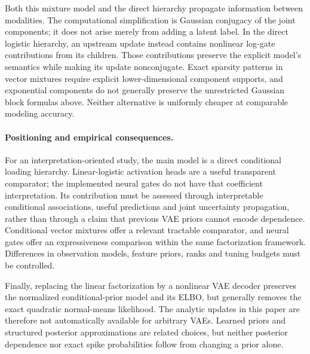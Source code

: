Both this mixture model and the direct hierarchy propagate information
between modalities. The computational simplification is Gaussian
conjugacy of the joint components; it does not arise merely from adding
a latent label. In the direct logistic hierarchy, an upstream update
instead contains nonlinear log-gate contributions from its children.
Those contributions preserve the explicit model's semantics while
making its update nonconjugate. Exact sparsity patterns in vector
mixtures require explicit lower-dimensional component supports, and
exponential components do not generally preserve the unrestricted
Gaussian block formulas above. Neither alternative is uniformly cheaper
at comparable modeling accuracy.

\paragraph{Positioning and empirical consequences.}
For an interpretation-oriented study, the main model is a direct
conditional loading hierarchy. Linear-logistic activation heads are a useful
transparent comparator; the implemented neural gates do not have that
coefficient interpretation. Its contribution must be assessed
through interpretable conditional associations, useful predictions and
joint uncertainty propagation, rather than through a claim that previous
VAE priors cannot encode dependence.
Conditional vector mixtures offer a relevant tractable comparator,
and neural gates offer an expressiveness comparison within the same
factorization framework. Differences in observation models, feature
priors, ranks and tuning budgets must be controlled.

Finally, replacing the linear factorization by a nonlinear VAE decoder
preserves the normalized conditional-prior model and its ELBO, but
generally removes the exact quadratic normal-means likelihood.
The analytic updates in this paper are therefore not automatically
available for arbitrary VAEs. Learned priors and structured posterior
approximations are related choices, but neither posterior dependence
nor exact spike probabilities follow from changing a prior alone.

